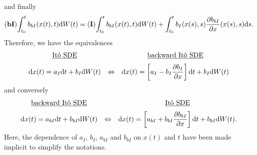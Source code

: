 and finally
\begin{equation}
	\bI \int_{t_0}^t b_{bI}(x(t),t) \rm dW(t) = \I\int_{t_0}^t b_{bI}(x(t),t) \rm dW(t) + \int_{t_0}^t b_I(x(s),s) \frac{\partial b_{bI}}{\partial x}(x(s),s) \rm ds.
\end{equation}
Therefore, we have the equivalences
\begin{equation}
	\begin{array}{ccc}
	\mbox{\underline{Itô SDE}} & & \mbox{\underline{backward Itô SDE}}\\[.2cm]
	\rm dx(t) = a_I \rm dt + b_I \rm dW(t) & \Leftrightarrow & \rm dx(t) = \left[a_I-b_I\dfrac{\partial b_I}{\partial x}\right]\rm dt + b_I \rm dW(t)
	\end{array} 	
\end{equation}
and conversely
\begin{equation} \label{eq:bI-I}
	\begin{array}{ccc}
	\mbox{\underline{backward Itô SDE}} & & \mbox{\underline{Itô SDE}}\\[.2cm]
	\rm dx(t) = a_{bI} \rm dt + b_{bI} \rm dW(t) & \Leftrightarrow & \rm dx(t) = \left[a_{bI}+b_{bI}\dfrac{\partial b_{bI}}{\partial x}\right]\rm dt + b_{bI} \rm dW(t).
	\end{array} 	
\end{equation}
Here, the dependence of $a_I$, $b_I$, $a_{bI}$ and $b_{bI}$ on $x(t)$ and $t$ have been made implicit to simplify the notations.

